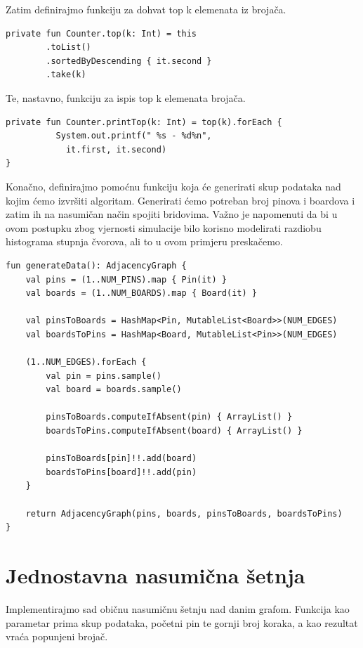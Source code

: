 \documentclass[times, utf8, seminar]{fer}
\begin{document}
Zatim definirajmo funkciju za dohvat top k elemenata iz brojača.

\begin{lstlisting}
private fun Counter.top(k: Int) = this
        .toList()
        .sortedByDescending { it.second }
        .take(k)
\end{lstlisting}

Te, nastavno, funkciju za ispis top k elemenata brojača.

\begin{lstlisting}
private fun Counter.printTop(k: Int) = top(k).forEach {
		  System.out.printf(" %s - %d%n",
		  	it.first, it.second)
}
\end{lstlisting}

		  Konačno, definirajmo pomoćnu funkciju koja će generirati skup podataka nad kojim ćemo izvršiti algoritam. Generirati ćemo potreban broj pinova i boardova i zatim ih na nasumičan način spojiti bridovima. Važno je napomenuti da bi u ovom postupku zbog vjernosti simulacije bilo korisno modelirati razdiobu histograma stupnja čvorova, ali to u ovom primjeru preskačemo.

\begin{lstlisting}
fun generateData(): AdjacencyGraph {
    val pins = (1..NUM_PINS).map { Pin(it) }
    val boards = (1..NUM_BOARDS).map { Board(it) }

    val pinsToBoards = HashMap<Pin, MutableList<Board>>(NUM_EDGES)
    val boardsToPins = HashMap<Board, MutableList<Pin>>(NUM_EDGES)

    (1..NUM_EDGES).forEach {
        val pin = pins.sample()
        val board = boards.sample()

        pinsToBoards.computeIfAbsent(pin) { ArrayList() }
        boardsToPins.computeIfAbsent(board) { ArrayList() }

        pinsToBoards[pin]!!.add(board)
        boardsToPins[board]!!.add(pin)
    }

    return AdjacencyGraph(pins, boards, pinsToBoards, boardsToPins)
}
\end{lstlisting}

\section{Jednostavna nasumična šetnja}

Implementirajmo sad običnu nasumičnu šetnju nad danim grafom. Funkcija kao parametar prima skup podataka, početni pin te gornji broj koraka, a kao rezultat vraća popunjeni brojač.
\end{document}
